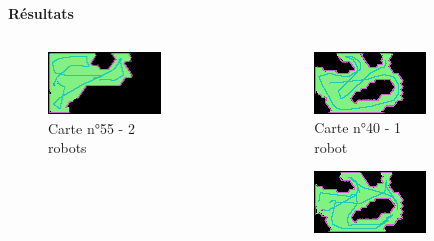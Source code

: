 \documentclass[aspectratio=169,10pt]{beamer}
\begin{document}
\begin{frame}{\textbf{Résultats}}
	\begin{columns}
		\begin{column}{0.33\textwidth}
			\begin{figure}[H]
				\centering
				\includegraphics[width=0.9\textwidth]{IMAGES/map55_explored_2robot.png}
				\caption*{Carte n°55 - 2 robots}
			\end{figure}
		\end{column}
		\begin{column}{0.33\textwidth}
			\begin{figure}[H]
				\centering
				\begin{subfigure}{0.9\textwidth}
					\centering
					\includegraphics[width=\textwidth]{IMAGES/map40_explored_1robot.png}
					\caption*{Carte n°40 - 1 robot}
				\end{subfigure}
				\vfill
				\begin{subfigure}{0.9\textwidth}
					\centering
					\includegraphics[width=\textwidth]{IMAGES/map40_explored_2robot.png}

\end{subfigure}
\end{figure}
\end{column}
\end{columns}
\end{frame}
\end{document}
